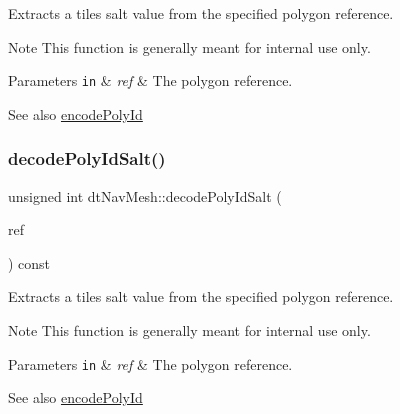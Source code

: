 Extracts a tile\textquotesingle{}s salt value from the specified polygon reference. \begin{DoxyNote}{Note}
This function is generally meant for internal use only. 
\end{DoxyNote}

\begin{DoxyParams}[1]{Parameters}
\mbox{\tt in}  & {\em ref} & The polygon reference. \\
\hline
\end{DoxyParams}
\begin{DoxySeeAlso}{See also}
\hyperlink{classdtNavMesh_a168a479840e7e32613f4b68ee4662d78}{encode\+Poly\+Id} 
\end{DoxySeeAlso}
\mbox{\label{classdtNavMesh_a588b6f839fd249430cff02cea71f347c}} 
\subsubsection{\texorpdfstring{decode\+Poly\+Id\+Salt()}{decodePolyIdSalt()}\hspace{0.1cm}{\footnotesize\ttfamily [2/2]}}
{\footnotesize\ttfamily unsigned int dt\+Nav\+Mesh\+::decode\+Poly\+Id\+Salt (\begin{DoxyParamCaption}\item[{\hyperlink{group__detour_gab4e0b2257a670c1a800057999612b466}{dt\+Poly\+Ref}}]{ref }\end{DoxyParamCaption}) const\hspace{0.3cm}{\ttfamily [inline]}}

Extracts a tile\textquotesingle{}s salt value from the specified polygon reference. \begin{DoxyNote}{Note}
This function is generally meant for internal use only. 
\end{DoxyNote}

\begin{DoxyParams}[1]{Parameters}
\mbox{\tt in}  & {\em ref} & The polygon reference. \\
\hline
\end{DoxyParams}
\begin{DoxySeeAlso}{See also}
\hyperlink{classdtNavMesh_a168a479840e7e32613f4b68ee4662d78}{encode\+Poly\+Id} 
\end{DoxySeeAlso}
\mbox{\label{classdtNavMesh_a94cfcf0015d7d6d856acaf96126cd349}} 
